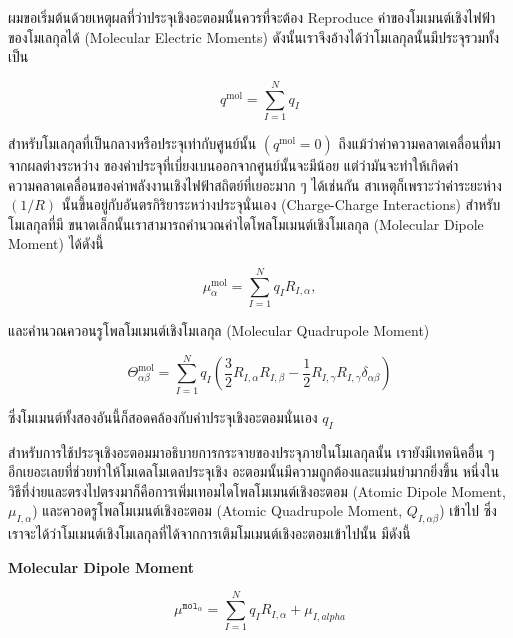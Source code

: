 ผมขอเริ่มต้นด้วยเหตุผลที่ว่าประจุเชิงอะตอมนั้นควรที่จะต้อง Reproduce ค่าของโมเมนต์เชิงไฟฟ้าของโมเลกุลได้ (Molecular Electric Moments)
ดังนั้นเราจึงอ้างได้ว่าโมเลกุลนั้นมีประจุรวมทั้งเป็น

\begin{equation}
  q^{\mathrm{mol}}
  =
  \sum_{I=1}^N q_I
\end{equation}

\noindent สำหรับโมเลกุลที่เป็นกลางหรือประจุเท่ากับศูนย์นั้น $(q^{\mathrm{mol}} = 0)$ ถึงแม้ว่าค่าความคลาดเคลื่อนที่มาจากผลต่างระหว่าง%
ของค่าประจุที่เบี่ยงเบนออกจากศูนย์นั้นจะมีน้อย แต่ว่ามันจะทำให้เกิดค่าความคลาดเคลื่อนของค่าพลังงานเชิงไฟฟ้าสถิตย์ที่เยอะมาก ๆ ได้เช่นกัน
สาเหตุก็เพราะว่าค่าระยะห่าง $(1 / R)$ นั้นขึ้นอยู่กับอันตรกิริยาระหว่างประจุนั่นเอง (Charge-Charge Interactions) สำหรับโมเลกุลที่มี%
ขนาดเล็กนั้นเราสามารถคำนวณค่าไดโพลโมเมนต์เชิงโมเลกุล (Molecular Dipole Moment) ได้ดังนี้

\begin{equation}
  \mu_\alpha^{\mathrm{mol}}
  =
  \sum_{I=1}^N q_I R_{I, \alpha},
\end{equation}

\noindent และคำนวณควอนรูโพลโมเมนต์เชิงโมเลกุล (Molecular Quadrupole Moment)

\begin{equation}
  \Theta_{\alpha \beta}^{\mathrm{mol}}
  =
  \sum_{I=1}^N q_I
  \left(
  \frac{3}{2} R_{I, \alpha} R_{I, \beta}
  -\frac{1}{2} R_{I, \gamma} R_{I, \gamma} \delta_{\alpha \beta}
  \right)
\end{equation}

\noindent ซึ่งโมเมนต์ทั้งสองอันนี้ก็สอดคล้องกับค่าประจุเชิงอะตอมนั่นเอง $q_I$

สำหรับการใช้ประจุเชิงอะตอมมาอธิบายการกระจายของประจุภายในโมเลกุลนั้น เรายังมีเทคนิคอื่น ๆ อีกเยอะเลยที่ช่วยทำให้โมเดลโมเดลประจุเชิง%
อะตอมนั้นมีความถูกต้องและแม่นยำมากยิ่งขึ้น หนึ่งในวิธีที่ง่ายและตรงไปตรงมาก็คือการเพิ่มเทอมไดโพลโมเมนต์เชิงอะตอม (Atomic Dipole
Moment, $\mu_{I,\alpha}$) และควอดรูโพลโมเมนต์เชิงอะตอม (Atomic Quadrupole Moment, $Q_{I,\alpha \beta}$) เข้าไป
ซึ่งเราจะได้ว่าโมเมนต์เชิงโมเลกุลที่ได้จากการเติมโมเมนต์เชิงอะตอมเข้าไปนั้น มีดังนี้

\noindent \textbf{Molecular Dipole Moment}

\begin{equation}
  \label{eq:mol_moment_mu}
  \mu^{\texttt{mol}_{\alpha}}
  =
  \sum^{N}_{I=1} q_{I} R_{I,\alpha} + \mu_{I,alpha}
\end{equation}

